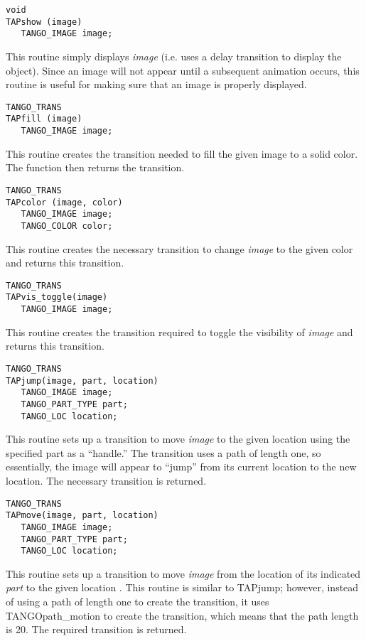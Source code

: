 \vspace{1em}
\begin{verbatim}
void
TAPshow (image)
   TANGO_IMAGE image;
\end{verbatim}
This routine simply displays {\em image} (i.e. uses a delay transition
to display the object).  Since an image will not appear until a subsequent
animation occurs, this routine is useful for making sure that an image is
properly displayed.

\vspace{1em}
\begin{verbatim}
TANGO_TRANS
TAPfill (image)
   TANGO_IMAGE image;
\end{verbatim}
This routine creates the transition needed to fill the given image to a
solid color.  The function then returns the transition.

\vspace{1em}
\begin{verbatim}
TANGO_TRANS
TAPcolor (image, color)
   TANGO_IMAGE image;
   TANGO_COLOR color;
\end{verbatim}
This routine creates the necessary transition to change {\em image} to the
given color and returns this transition.

\vspace{1em}
\begin{verbatim}
TANGO_TRANS
TAPvis_toggle(image)
   TANGO_IMAGE image;
\end{verbatim}
This routine creates the transition required to toggle the visibility of
{\em image} and returns this transition.

\vspace{1em}
\begin{verbatim}
TANGO_TRANS
TAPjump(image, part, location)
   TANGO_IMAGE image;
   TANGO_PART_TYPE part;
   TANGO_LOC location;
\end{verbatim}
This routine sets up a transition to move {\em image} to the given location
using the specified part as a ``handle.''  The transition uses a path of
length one, so essentially, the image will appear to ``jump'' from its current
location to the new location.  The necessary transition is returned.

\vspace{1em}
\begin{verbatim}
TANGO_TRANS
TAPmove(image, part, location)
   TANGO_IMAGE image;
   TANGO_PART_TYPE part;
   TANGO_LOC location;
\end{verbatim}
This routine sets up a transition to move {\em image} from the location
of its indicated {\em part} to the given location .  This routine is similar
to TAPjump; however, instead of using a path of length one to create the
transition, it uses TANGOpath\_motion to create the transition, which means
that the path length is 20.  The required transition is returned.

